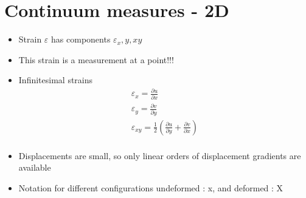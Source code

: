 \section{Continuum measures - 2D}

	\begin{frame}
		\begin{block}{}
			\begin{itemize}
				\item Strain $\varepsilon$ has components $\varepsilon_x,y,xy$
				 \item This strain is a measurement at a point!!!
				 \item Infinitesimal strains 
				 \begin{align*}
				 	\varepsilon_x = \frac{\partial u}{\partial x} \\
					\varepsilon_y = \frac{\partial v}{\partial y} \\
					\varepsilon_{xy} = \frac{1}{2}\left( \frac{\partial u}{\partial y} + \frac{\partial v}{\partial x}\right) \\
				 \end{align*}
				
			\end{itemize}
		\end{block}
	\begin{itemize}
		\item Displacements are small, so only linear orders of displacement gradients are available
		\item Notation for different configurations undeformed : x, and deformed : X
		
	\end{itemize}
	\end{frame}

